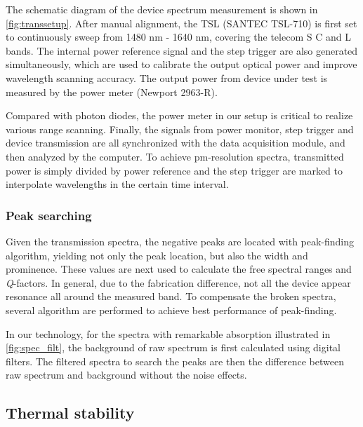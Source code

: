 The schematic diagram of the device spectrum measurement is shown in \autoref{fig:transsetup}. 
After manual alignment, the TSL (SANTEC TSL-710) is first set to continuously sweep from 1480 nm - 1640 nm, covering the telecom S C and L bands.
The internal power reference signal and the step trigger are also generated simultaneously, which are used to calibrate the output optical power and improve wavelength scanning accuracy. The output power from device under test is measured by the power meter (Newport 2963-R). 

Compared with photon diodes, the power meter in our setup is critical to realize various range scanning.  Finally, the signals from power monitor, step trigger and device transmission are all synchronized with the data acquisition module, and then analyzed by the computer. To achieve pm-resolution spectra, transmitted power is simply divided by power reference and the step trigger are marked to interpolate wavelengths in the certain time interval.

\subsubsection{Peak searching}

Given the transmission spectra, the negative peaks are located with peak-finding algorithm, yielding not only the peak location, but also the width and prominence. These values are next used to calculate the free spectral ranges and \textit{Q}-factors. In general, due to the fabrication difference, not all the device appear resonance all around the measured band. To compensate the broken spectra, several algorithm are performed to achieve best performance of peak-finding. 

\begin{figure}
	\centering
	
	\mycaption{}{}
	\label{fig:spec_filt}
\end{figure}

In our technology, for the spectra with remarkable absorption illustrated in \autoref{fig:spec_filt}, the background of raw spectrum is first calculated using digital filters. The filtered spectra to search the peaks are then the difference between raw spectrum and background without the noise effects.


\subsection{Thermal stability}


